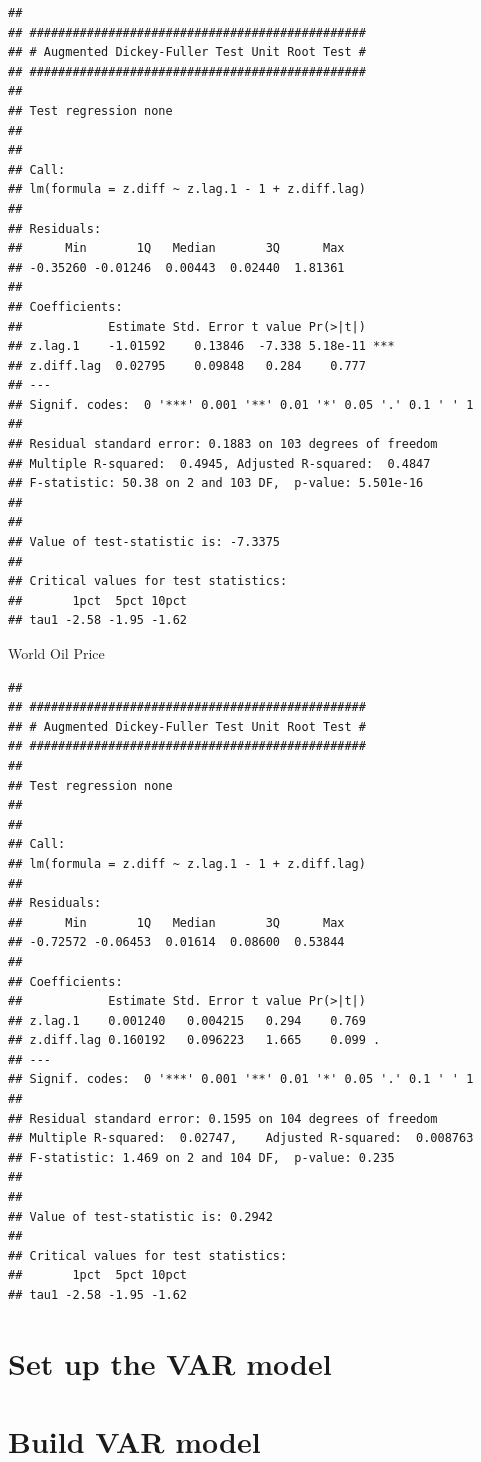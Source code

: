 \documentclass[11pt,preprint, authoryear]{elsarticle}
\numberwithin{equation}{section}
\numberwithin{figure}{section}
\numberwithin{table}{section}
\begin{document}
\begin{verbatim}
## 
## ############################################### 
## # Augmented Dickey-Fuller Test Unit Root Test # 
## ############################################### 
## 
## Test regression none 
## 
## 
## Call:
## lm(formula = z.diff ~ z.lag.1 - 1 + z.diff.lag)
## 
## Residuals:
##      Min       1Q   Median       3Q      Max 
## -0.35260 -0.01246  0.00443  0.02440  1.81361 
## 
## Coefficients:
##            Estimate Std. Error t value Pr(>|t|)    
## z.lag.1    -1.01592    0.13846  -7.338 5.18e-11 ***
## z.diff.lag  0.02795    0.09848   0.284    0.777    
## ---
## Signif. codes:  0 '***' 0.001 '**' 0.01 '*' 0.05 '.' 0.1 ' ' 1
## 
## Residual standard error: 0.1883 on 103 degrees of freedom
## Multiple R-squared:  0.4945, Adjusted R-squared:  0.4847 
## F-statistic: 50.38 on 2 and 103 DF,  p-value: 5.501e-16
## 
## 
## Value of test-statistic is: -7.3375 
## 
## Critical values for test statistics: 
##       1pct  5pct 10pct
## tau1 -2.58 -1.95 -1.62
\end{verbatim}

World Oil Price

\begin{verbatim}
## 
## ############################################### 
## # Augmented Dickey-Fuller Test Unit Root Test # 
## ############################################### 
## 
## Test regression none 
## 
## 
## Call:
## lm(formula = z.diff ~ z.lag.1 - 1 + z.diff.lag)
## 
## Residuals:
##      Min       1Q   Median       3Q      Max 
## -0.72572 -0.06453  0.01614  0.08600  0.53844 
## 
## Coefficients:
##            Estimate Std. Error t value Pr(>|t|)  
## z.lag.1    0.001240   0.004215   0.294    0.769  
## z.diff.lag 0.160192   0.096223   1.665    0.099 .
## ---
## Signif. codes:  0 '***' 0.001 '**' 0.01 '*' 0.05 '.' 0.1 ' ' 1
## 
## Residual standard error: 0.1595 on 104 degrees of freedom
## Multiple R-squared:  0.02747,    Adjusted R-squared:  0.008763 
## F-statistic: 1.469 on 2 and 104 DF,  p-value: 0.235
## 
## 
## Value of test-statistic is: 0.2942 
## 
## Critical values for test statistics: 
##       1pct  5pct 10pct
## tau1 -2.58 -1.95 -1.62
\end{verbatim}

\hypertarget{set-up-the-var-model}{%
\section{Set up the VAR model}\label{set-up-the-var-model}}

\hypertarget{build-var-model}{%
\section{Build VAR model}\label{build-var-model}}
\end{document}
